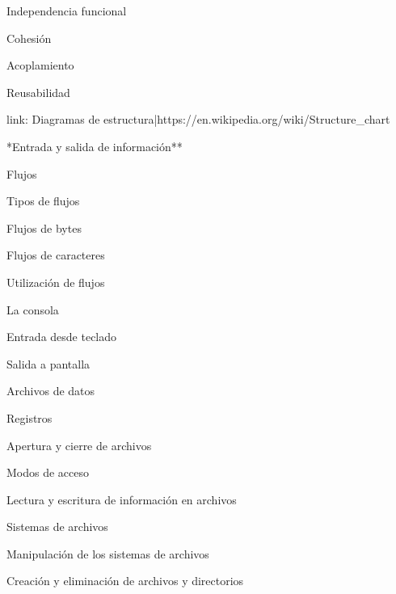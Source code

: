 \begin{longenum}
\begin{longenum}
\begin{longenum}
            \item Independencia funcional
            \begin{longenum}
                \item Cohesión
                \item Acoplamiento
            \end{longenum}
            \item Reusabilidad
        \end{longenum}
        \item [link: Diagramas de estructura|https://en.wikipedia.org/wiki/Structure_chart]
    \end{longenum}
    \item **Entrada y salida de información**
    \begin{longenum}
        \item Flujos
        \begin{longenum}
            \item Tipos de flujos
            \begin{longenum}
                \item Flujos de bytes
                \item Flujos de caracteres
            \end{longenum}
            \item Utilización de flujos
        \end{longenum}
        \item La consola
        \begin{longenum}
            \item Entrada desde teclado
            \item Salida a pantalla
        \end{longenum}
        \item Archivos de datos
        \begin{longenum}
            \item Registros
            \item Apertura y cierre de archivos
            \item Modos de acceso
            \item Lectura y escritura de información en archivos
        \end{longenum}
        \item Sistemas de archivos
        \begin{longenum}
            \item Manipulación de los sistemas de archivos
            \item Creación y eliminación de archivos y directorios

\end{longenum}
\end{longenum}
\end{longenum}
